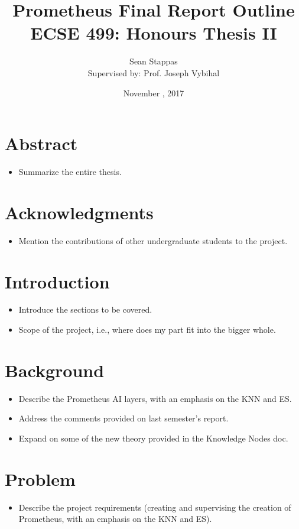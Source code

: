 \documentclass[11pt]{article}
\title
{
	\Large\textbf{Prometheus Final Report Outline} \\ 
	\large ECSE 499: Honours Thesis II
}
\author %
{
	Sean Stappas \\
	\small Supervised by: Prof. Joseph Vybihal
}
\date{November \nth{10}, 2017}
\begin{document}
	
\sloppy

\twocolumn
\maketitle

\section*{Abstract}
\begin{itemize}
	\item Summarize the entire thesis.
\end{itemize}

\section*{Acknowledgments}
\begin{itemize}
	\item Mention the contributions of other undergraduate students to the project.
\end{itemize}

\section{Introduction}
\begin{itemize}
	\item Introduce the sections to be covered.
	\item Scope of the project, i.e., where does my part fit into the bigger whole.
\end{itemize}

\section{Background}
\begin{itemize}
	\item Describe the Prometheus AI layers, with an emphasis on the KNN and ES.
	\item Address the comments provided on last semester's report.
	\item Expand on some of the new theory provided in the Knowledge Nodes doc.
\end{itemize}

\section{Problem}
\begin{itemize}
	\item Describe the project requirements (creating and supervising the creation of Prometheus, with an emphasis on the KNN and ES).
\end{itemize}
\end{document}
